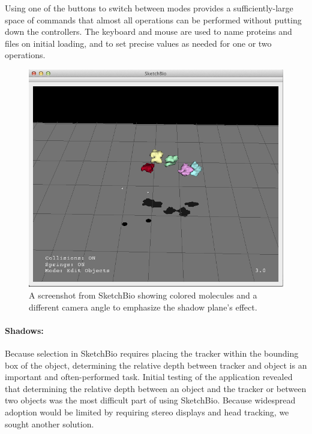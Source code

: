 \documentclass[twocolumn]{bmcart}%
\begin{document}
Using one of the buttons to switch between modes provides a sufficiently-large space of commands that almost all operations can be performed without putting down the controllers.
The keyboard and mouse are used to name proteins and files on initial loading, and to set precise values as needed for one or two operations.

\begin{figure}[h]
\centering
\includegraphics[width=0.9\columnwidth]{shadow_plane.png}
\caption{A screenshot from SketchBio showing colored molecules and a different camera angle to emphasize the shadow plane's effect.}
\label{fig:shadow_plane}
\end{figure}

\paragraph*{Shadows:}
Because selection in SketchBio requires placing the tracker within the bounding box of the object, determining the relative depth between tracker and object is an important and often-performed task.
Initial testing of the application revealed that determining the relative depth between an object and the tracker or between two objects was the most difficult part of using SketchBio.
Because widespread adoption would be limited by requiring stereo displays and head tracking, we sought another solution.
\end{document}
